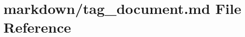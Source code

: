 \hypertarget{tag__document_8md}{}\section{markdown/tag\+\_\+document.md File Reference}
\label{tag__document_8md}
